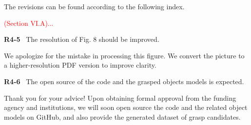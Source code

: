 \documentclass[journal]{IEEEtran}
\newcommand{\rev}[1]{\textcolor{red}{#1}}
\begin{document}
The revisions can be found according to the following index.

\rev{(Section VI.A)...}
\bigskip

\noindent
{\textbf{\color{black}R4-5}\color{gray}~
The resolution of Fig. 8 should be improved.
}

We apologize for the mistake in processing this figure. We convert the picture to a higher-resolution PDF version to improve clarity. 
\bigskip

\noindent
{\textbf{\color{black}R4-6}\color{gray}~
The open source of the code and the grasped objects models is expected.
}

Thank you for your advice! Upon obtaining formal approval from the funding agency and institutions, we will soon open source the code and the related object models on GitHub, and also provide the generated dataset of grasp candidates.
\bigskip
\noindent


\end{document}
